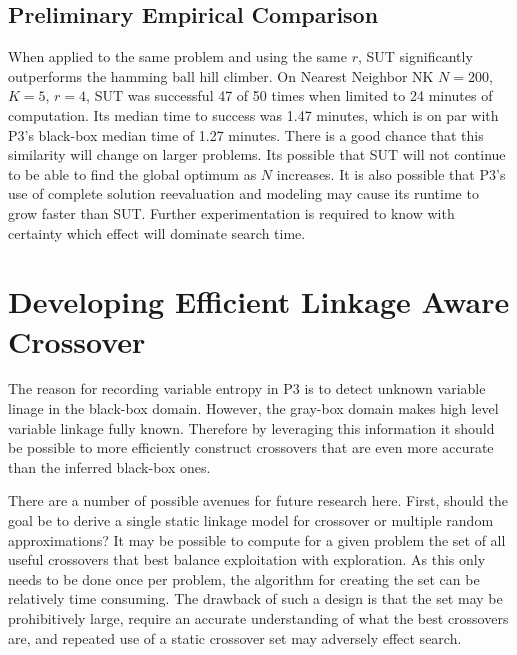 \subsection{Preliminary Empirical Comparison}
When applied to the same problem and using the same $r$, SUT significantly outperforms the hamming ball hill climber.
On Nearest Neighbor NK $N=200$, $K=5$, $r=4$, SUT was successful 47 of 50 times when limited to 24 minutes of computation.
Its median time to success was 1.47 minutes, which is on par with P3's black-box median time of 1.27 minutes.
There is a good chance that this similarity will change on larger problems. Its possible that SUT will not
continue to be able to find the global optimum as $N$ increases. It is also possible that P3's use of complete solution
reevaluation and modeling may cause its runtime to grow faster than SUT. Further experimentation is required to know
with certainty which effect will dominate search time.

\section{Developing Efficient Linkage Aware Crossover}
The reason for recording variable entropy in P3 is to detect unknown variable linage in the black-box domain. However,
the gray-box domain makes high level variable linkage fully known. Therefore by leveraging this information it should
be possible to more efficiently construct crossovers that are even more accurate than the inferred black-box ones.

There are a number of possible avenues for future research here. First, should the goal be to derive a single
static linkage model for crossover or multiple random approximations? It may be possible to compute for
a given problem the set of all useful crossovers that best balance exploitation with exploration. As
this only needs to be done once per problem, the algorithm for creating the set can be relatively time consuming.
The drawback of such a design is that the set may be prohibitively large, require an accurate understanding of what
the best crossovers are, and repeated use of a static crossover set may adversely effect search.


